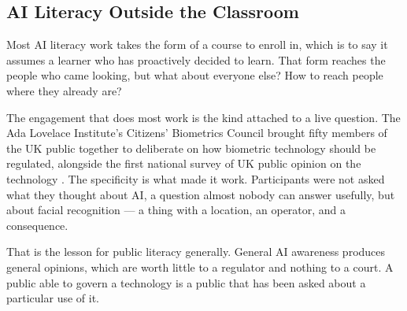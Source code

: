 \subsection{AI Literacy Outside the Classroom}
\label{sec:8.2.3}
Most AI literacy work takes the form of a course to enroll in, which is to say it assumes a learner who has proactively decided to learn. That form reaches the people who came looking, but what about everyone else? How to reach people where they already are?

The engagement that does most work is the kind attached to a live question. The Ada Lovelace Institute's Citizens' Biometrics Council brought fifty members of the UK public together to deliberate on how biometric technology should be regulated, alongside the first national survey of UK public opinion on the technology \autocite{adalovelaceinstitute2021biometrics}. The specificity is what made it work. Participants were not asked what they thought about AI, a question almost nobody can answer usefully, but about facial recognition — a thing with a location, an operator, and a consequence.

That is the lesson for public literacy generally. General AI awareness produces general opinions, which are worth little to a regulator and nothing to a court. A public able to govern a technology is a public that has been asked about a particular use of it.
